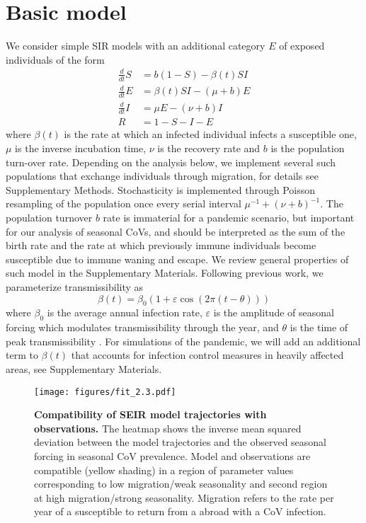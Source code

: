 \documentclass[rmp, reprint, superscriptaddress, floatfix,amsmath]{revtex4-1}
\newcommand{\forcing}{\varepsilon}
\begin{document}
\section{Basic model}
We consider simple SIR models \citep{kermack_contributions_1991} with an additional category $E$ of exposed individuals of the form 
\begin{equation}
\begin{split}
\frac{d}{dt} S & = b(1-S) - \beta(t) S I \\
\frac{d}{dt} E & = \beta(t) S I - (\mu +b) E\\
\frac{d}{dt} I & = \mu E - (\nu+b) I \\
R & = 1-S-I-E
\end{split}
\label{eq:SIR}
\end{equation}
where $\beta(t)$ is the rate at which an infected individual infects a susceptible one, $\mu$ is the inverse incubation time, $\nu$ is the recovery rate and $b$ is the population turn-over rate. 
Depending on the analysis below, we implement several such populations that exchange individuals through migration, for details see Supplementary Methods. 
Stochasticity is implemented through Poisson resampling of the population once every serial interval $\mu^{-1}+(\nu+b)^{-1}$.
The population turnover $b$ rate is immaterial for a pandemic scenario, but important for our analysis of seasonal CoVs, and should be interpreted as the sum of the birth rate and the rate at which previously immune individuals become susceptible due to immune waning and escape.
We review general properties of such model in the Supplementary Materials. 
Following previous work, we parameterize transmissibility as 
\begin{equation}
\beta(t) = \beta_0\left(1+\forcing\cos(2\pi (t-\theta))\right)
\label{eq:transmissibility}
\end{equation}
where $\beta_0$ is the average annual infection rate, $\forcing$ is the amplitude of seasonal forcing which modulates transmissibility through the year, and $\theta$ is the time of peak transmissibility \citep{dushoff_dynamical_2004,chen_regular_2017}.
For simulations of the pandemic, we will add an additional term to $\beta(t)$ that accounts for infection control measures in heavily affected areas, see Supplementary Materials.

\begin{figure}
    \centering
    \texttt{[image: figures/fit\_2.3.pdf]}
    \caption{{\bf Compatibility of SEIR model trajectories with observations.} The heatmap shows the inverse mean squared deviation between the model trajectories and the observed seasonal forcing in seasonal CoV prevalence. Model and observations are compatible (yellow shading) in a region of parameter values corresponding to low migration/weak seasonality and second region at high migration/strong seasonality. Migration refers to the rate per year of a susceptible to return from a abroad with a CoV infection.}
    \label{fig:parameter_seasonal}
\end{figure}
\end{document}
